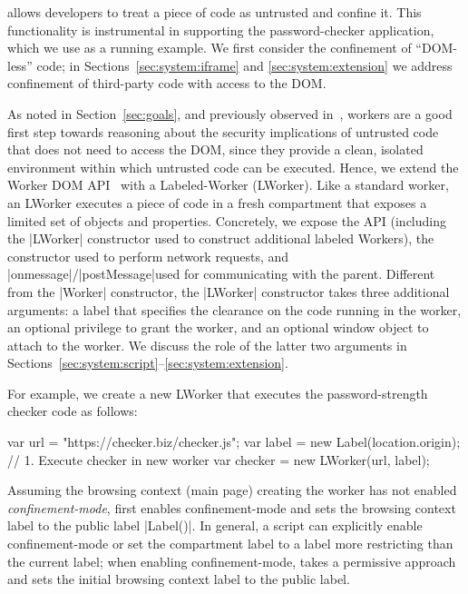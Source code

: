 %
%
%
\sys{} allows developers to treat a piece of code as untrusted and
confine it. This functionality is instrumental in supporting the
password-checker application, which we use as a running example.
%
We first consider the confinement of ``DOM-less'' code; in
Sections~\ref{sec:system:iframe} and \ref{sec:system:extension} we
address confinement of third-party code with access to the DOM.

As noted in Section~\ref{sec:goals}, and previously observed
in~\cite{Ingram:2012}, workers are a good first step towards reasoning
about the security implications of untrusted code that does not need
to access the DOM, since they provide a clean, isolated environment
within which untrusted code can be executed.
%
Hence, we extend the Worker DOM API~\cite{workers} with a
Labeled-Worker (LWorker).
%
Like a standard worker, an LWorker executes a piece of code in a fresh
compartment that exposes a limited set of objects and properties.
%
Concretely, we expose the \sys{} API (including the \js|LWorker|
constructor used to construct additional labeled Workers), the \xhr{}
constructor used to perform network requests, and
\js|onmessage|/\js|postMessage|used for communicating with the
parent.
%
Different from the \js|Worker| constructor, the \js|LWorker|
constructor takes three additional arguments: a label that specifies the
clearance on the code running in the worker, an optional privilege
to grant the worker, and an optional window object to attach to the worker.
%
We discuss the role of the latter two arguments in Sections~\ref{sec:system:script}--\ref{sec:system:extension}.

For example, we create a new LWorker that executes the
password-strength checker code as follows:
\begin{jscode}
var url = "https://checker.biz/checker.js";
var label = new Label(location.origin);
// 1. Execute checker in new worker
var checker = new LWorker(url, label);
\end{jscode}
%
Assuming the browsing context (main page) creating the worker has not
enabled \emph{confinement-mode}, \sys{} first enables confinement-mode
and sets the browsing context label to the public label \js|Label()|.
%
In general, a script can explicitly enable confinement-mode or set
the compartment label to a label more restricting than the current
label; when enabling confinement-mode, \sys{} takes a
permissive approach and sets the initial browsing context label to the
public label.
 
